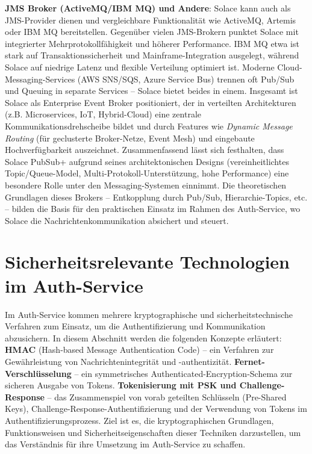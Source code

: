 \textbf{JMS Broker (ActiveMQ/IBM MQ) und Andere}: Solace kann auch als JMS-Provider dienen und vergleichbare Funktionalität wie ActiveMQ, Artemis oder IBM MQ bereitstellen. Gegenüber vielen JMS-Brokern punktet Solace mit integrierter Mehrprotokollfähigkeit und höherer Performance. IBM MQ etwa ist stark auf Transaktionssicherheit und Mainframe-Integration ausgelegt, während Solace auf niedrige Latenz und flexible Verteilung optimiert ist. Moderne Cloud-Messaging-Services (AWS SNS/SQS, Azure Service Bus) trennen oft Pub/Sub und Queuing in separate Services – Solace bietet beides in einem. Insgesamt ist Solace als \glqq Enterprise Event Broker\grqq{} positioniert, der in verteilten Architekturen (z.B. Microservices, IoT, Hybrid-Cloud) eine zentrale Kommunikationsdrehscheibe bildet und durch Features wie \textit{Dynamic Message Routing} (für geclusterte Broker-Netze, Event Mesh) und eingebaute Hochverfügbarkeit auszeichnet.
Zusammenfassend lässt sich festhalten, dass Solace PubSub+ aufgrund seines architektonischen Designs (vereinheitlichtes Topic/Queue-Model, Multi-Protokoll-Unterstützung, hohe Performance) eine besondere Rolle unter den Messaging-Systemen einnimmt. Die theoretischen Grundlagen dieses Brokers – Entkopplung durch Pub/Sub, Hierarchie-Topics, etc. – bilden die Basis für den praktischen Einsatz im Rahmen des Auth-Service, wo Solace die Nachrichtenkommunikation absichert und steuert.


\section{Sicherheitsrelevante Technologien im Auth-Service}

Im Auth-Service kommen mehrere kryptographische und sicherheitstechnische Verfahren zum Einsatz, um die Authentifizierung und Kommunikation abzusichern. In diesem Abschnitt werden die folgenden Konzepte erläutert:
\textbf{HMAC} (Hash-based Message Authentication Code) – ein Verfahren zur Gewährleistung von Nachrichtenintegrität und -authentizität.
\textbf{Fernet-Verschlüsselung} – ein symmetrisches Authenticated-Encryption-Schema zur sicheren Ausgabe von Tokens.
\textbf{Tokenisierung mit PSK und Challenge-Response} – das Zusammenspiel von vorab geteilten Schlüsseln (Pre-Shared Keys), Challenge-Response-Authentifizierung und der Verwendung von Tokens im Authentifizierungsprozess.
Ziel ist es, die kryptographischen Grundlagen, Funktionsweisen und Sicherheitseigenschaften dieser Techniken darzustellen, um das Verständnis für ihre Umsetzung im Auth-Service zu schaffen.

